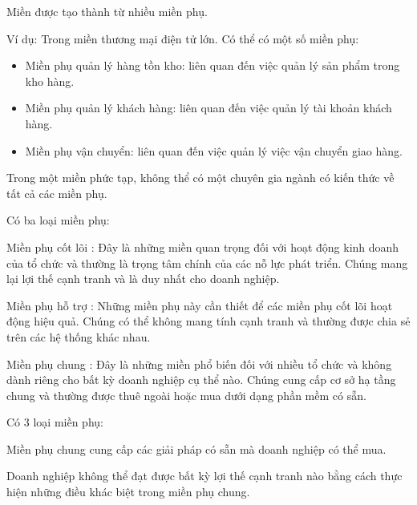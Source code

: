 Miền được tạo thành từ nhiều miền phụ.

Ví dụ: Trong miền thương mại điện tử lớn. Có thể có một số miền phụ:







\begin{itemize}
    \item       Miền phụ quản lý hàng tồn kho: liên quan đến việc quản lý sản phẩm trong kho hàng.
    \item       Miền phụ quản lý khách hàng: liên quan đến việc quản lý tài khoản khách hàng.
    \item       Miền phụ vận chuyển: liên quan đến việc quản lý việc vận chuyển giao hàng.
\end{itemize}









Trong một miền phức tạp, không thể có một chuyên gia ngành có kiến thức về tất cả các miền phụ. 

Có ba loại miền phụ:

Miền phụ cốt lõi : Đây là những miền quan trọng đối với hoạt động kinh doanh của tổ chức và thường là trọng tâm chính của các nỗ lực phát triển. Chúng mang lại lợi thế cạnh tranh và là duy nhất cho doanh nghiệp.

Miền phụ hỗ trợ : Những miền phụ này cần thiết để các miền phụ cốt lõi hoạt động hiệu quả. Chúng có thể không mang tính cạnh tranh và thường được chia sẻ trên các hệ thống khác nhau.

Miền phụ chung : Đây là những miền phổ biến đối với nhiều tổ chức và không dành riêng cho bất kỳ doanh nghiệp cụ thể nào. Chúng cung cấp cơ sở hạ tầng chung và thường được thuê ngoài hoặc mua dưới dạng phần mềm có sẵn.
 


Có 3 loại miền phụ:


Miền phụ chung cung cấp các giải pháp có sẵn mà doanh nghiệp có thể mua.

Doanh nghiệp không thể đạt được bất kỳ lợi thế cạnh tranh nào bằng cách thực hiện những điều khác biệt trong miền phụ chung.



